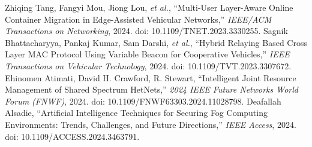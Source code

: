  Zhiqing Tang, Fangyi Mou, Jiong Lou, \emph{et al.}, ``Multi-User Layer-Aware Online Container Migration in Edge-Assisted Vehicular Networks,'' \emph{IEEE/ACM Transactions on Networking}, 2024. doi: 10.1109/TNET.2023.3330255.
 Sagnik Bhattacharyya, Pankaj Kumar, Sam Darshi, \emph{et al.}, ``Hybrid Relaying Based Cross Layer MAC Protocol Using Variable Beacon for Cooperative Vehicles,'' \emph{IEEE Transactions on Vehicular Technology}, 2024. doi: 10.1109/TVT.2023.3307672.
 Ehinomen Atimati, David H. Crawford, R. Stewart, ``Intelligent Joint Resource Management of Shared Spectrum HetNets,'' \emph{2024 IEEE Future Networks World Forum (FNWF)}, 2024. doi: 10.1109/FNWF63303.2024.11028798.
 Deafallah Alsadie, ``Artificial Intelligence Techniques for Securing Fog Computing Environments: Trends, Challenges, and Future Directions,'' \emph{IEEE Access}, 2024. doi: 10.1109/ACCESS.2024.3463791.
